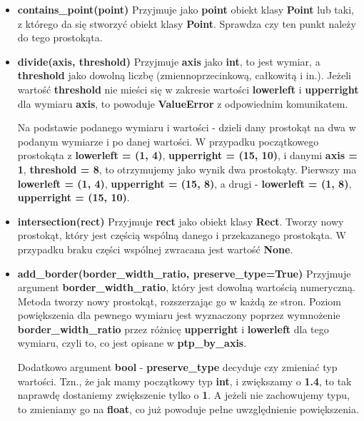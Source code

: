\documentclass[a4paper, 12pt]{article}
\begin{document}
\begin{itemize}
          \item \textbf{contains\_point(point)} \vspace{6pt}\newline
          \quad Przyjmuje jako \textbf{point} obiekt klasy \textbf{Point} lub taki, z którego da się stworzyć obiekt klasy \textbf{Point}. Sprawdza czy ten punkt należy do tego prostokąta.
          \vspace{6pt}
          
          \item \textbf{divide(axis, threshold)} \vspace{6pt}\newline
          \quad Przyjmuje \textbf{axis} jako \textbf{int}, to jest wymiar, a \textbf{threshold} jako dowolną liczbę (zmiennoprzecinkową, całkowitą i in.). Jeżeli wartość \textbf{threshold} nie mieści się w zakresie wartości \textbf{lowerleft} i \textbf{upperright} dla wymiaru \textbf{axis}, to powoduje \textbf{ValueError} z odpowiednim komunikatem.
          
          \noindent
          \quad Na podstawie podanego wymiaru i wartości - dzieli dany prostokąt na dwa w podanym wymiarze i po danej wartości. W przypadku początkowego prostokąta z \textbf{lowerleft = (1, 4)}, \textbf{upperright = (15, 10)}, i danymi \textbf{axis = 1}, \textbf{threshold = 8}, to otrzymujemy jako wynik dwa prostokąty. Pierwszy ma \textbf{lowerleft = (1, 4)}, \textbf{upperright = (15, 8)}, a drugi - \textbf{lowerleft = (1, 8)}, \textbf{upperright = (15, 10)}.
          \vspace{6pt}
          
          \item \textbf{intersection(rect)} \vspace{6pt}\newline
          \quad Przyjmuje \textbf{rect} jako obiekt klasy \textbf{Rect}. Tworzy nowy prostokąt, który jest częścią wspólną danego i przekazanego prostokąta. W przypadku braku części wspólnej zwracana jest wartość \textbf{None}.
          \vspace{6pt}
          
          \item \textbf{add\_border(border\_width\_ratio, preserve\_type=True)} \vspace{6pt}\newline
          \quad Przyjmuje argument \textbf{border\_width\_ratio}, który jest dowolną wartością numeryczną. Metoda tworzy nowy prostokąt, rozszerzając go w każdą ze stron. Poziom powiększenia dla pewnego wymiaru jest wyznaczony poprzez wymnożenie \textbf{border\_width\_ratio} przez różnicę \textbf{upperright} i \textbf{lowerleft} dla tego wymiaru, czyli to, co jest opisane w \textbf{ptp\_by\_axis}.
          
          \noindent
          \quad Dodatkowo argument \textbf{bool} - \textbf{preserve\_type} decyduje czy zmieniać typ wartości. Tzn., że jak mamy początkowy typ \textbf{int}, i zwiększamy o \textbf{1.4}, to tak naprawdę dostaniemy zwiększenie tylko o \textbf{1}. A jeżeli nie zachowujemy typu, to zmieniamy go na \textbf{float}, co już powoduje pełne uwzględnienie powiększenia.
      \end{itemize}
\end{document}
